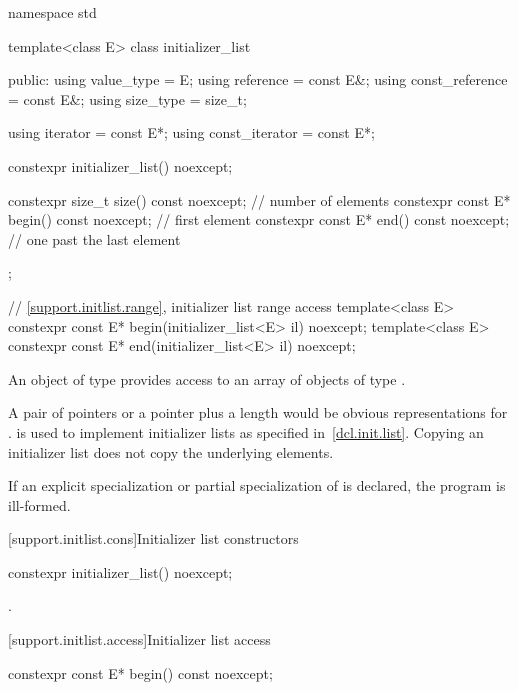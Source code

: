 \begin{codeblock}
namespace std {
  template<class E> class initializer_list {
  public:
    using value_type      = E;
    using reference       = const E&;
    using const_reference = const E&;
    using size_type       = size_t;

    using iterator        = const E*;
    using const_iterator  = const E*;

    constexpr initializer_list() noexcept;

    constexpr size_t size() const noexcept;     // number of elements
    constexpr const E* begin() const noexcept;  // first element
    constexpr const E* end() const noexcept;    // one past the last element
  };

  // \ref{support.initlist.range}, initializer list range access
  template<class E> constexpr const E* begin(initializer_list<E> il) noexcept;
  template<class E> constexpr const E* end(initializer_list<E> il) noexcept;
}
\end{codeblock}

\pnum
An object of type  provides access to an array of
objects of type .
\begin{note}
A pair of pointers or a pointer plus
a length would be obvious representations for .
 is used to implement initializer lists as specified
in~\ref{dcl.init.list}. Copying an initializer list does not copy the underlying
elements.
\end{note}

\pnum
If an explicit specialization or partial specialization of
 is declared, the program is ill-formed.

[support.initlist.cons]{Initializer list constructors}

%
\begin{itemdecl}
constexpr initializer_list() noexcept;
\end{itemdecl}

\begin{itemdescr}
\pnum
\ensures
{}.
\end{itemdescr}

[support.initlist.access]{Initializer list access}

%
\begin{itemdecl}
constexpr const E* begin() const noexcept;
\end{itemdecl}

